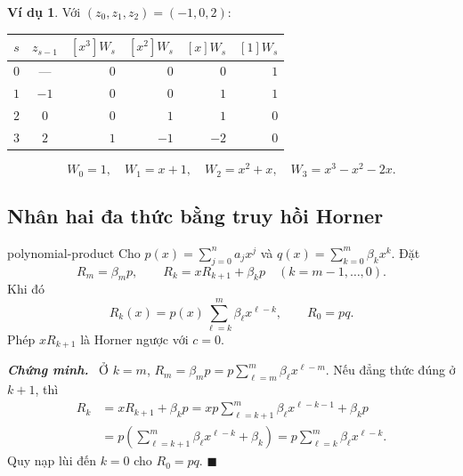 \documentclass[12pt,a4paper,oneside]{book}
\numberwithin{algorithm}{chapter}
\theoremstyle{definition}
\newtheorem{vidu}{Ví dụ}[chapter]
\newenvironment{chungminh}{\par\medskip\noindent\textbf{\textit{\color{mainblue}Chứng minh.}}\ }{\hfill$\blacksquare$\par\medskip}
\begin{document}
\begin{vidu}
Với $(z_0,z_1,z_2)=(-1,0,2)$:
\begin{center}
\begin{tabular}{c|c|rrrr}
\toprule
$s$ & $z_{s-1}$ & $[x^3]W_s$ & $[x^2]W_s$ & $[x]W_s$ & $[1]W_s$\\
\midrule
$0$ & --- & $0$ & $0$ & $0$ & $1$\\
$1$ & $-1$ & $0$ & $0$ & $1$ & $1$\\
$2$ & $0$ & $0$ & $1$ & $1$ & $0$\\
$3$ & $2$ & $1$ & $-1$ & $-2$ & $0$\\
\bottomrule
\end{tabular}
\end{center}
\[
 W_0=1,\quad W_1=x+1,\quad W_2=x^2+x,\quad
 W_3=x^3-x^2-2x.
\]
\end{vidu}

\subsection{Nhân hai đa thức bằng truy hồi Horner}
\begin{dinhly}{}{polynomial-product}
Cho $p(x)=\sum_{j=0}^{n}a_jx^j$ và $q(x)=\sum_{k=0}^{m}\beta_kx^k$. Đặt
\begin{equation}\label{eq:polynomial-horner-product}
 R_m=\beta_mp,\qquad R_k=xR_{k+1}+\beta_kp\quad(k=m-1,\ldots,0).
\end{equation}
Khi đó
\[
 R_k(x)=p(x)\sum_{\ell=k}^{m}\beta_\ell x^{\ell-k},\qquad R_0=pq.
\]
Phép $xR_{k+1}$ là Horner ngược với $c=0$.
\end{dinhly}
\begin{chungminh}
Ở $k=m$, $R_m=\beta_mp=p\sum_{\ell=m}^{m}\beta_\ell x^{\ell-m}$. Nếu đẳng thức đúng ở $k+1$, thì
\begin{align*}
 R_k&=xR_{k+1}+\beta_kp
 =xp\sum_{\ell=k+1}^{m}\beta_\ell x^{\ell-k-1}+\beta_kp\\
 &=p\left(\sum_{\ell=k+1}^{m}\beta_\ell x^{\ell-k}+\beta_k\right)
 =p\sum_{\ell=k}^{m}\beta_\ell x^{\ell-k}.
\end{align*}
Quy nạp lùi đến $k=0$ cho $R_0=pq$.
\end{chungminh}
\end{document}
